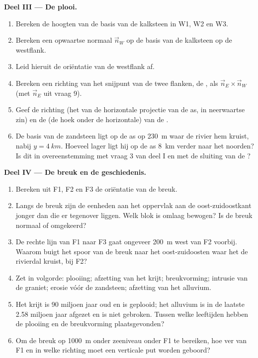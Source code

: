 \begin{problem}
\medskip
\noindent\textbf{Deel III --- De plooi.}
\begin{enumerate}[resume]
  \item Bereken de hoogten van de basis van de kalksteen in W1, W2 en W3.
  \item Bereken een opwaartse normaal $\vec n_W$ op de basis van de kalksteen op de westflank.
  \item Leid hieruit de oriëntatie van de westflank af.
  \item Bereken een richting van het snijpunt van de twee flanken, de , als $\vec n_E \times \vec n_W$
        (met $\vec n_E$ uit vraag 9).
  \item Geef de richting (het  van de horizontale projectie van de as, in neerwaartse zin) en de
         (de hoek onder de horizontale) van de .
  \item De basis van de zandsteen ligt op de as op \qty{230}{m} waar de rivier hem kruist, nabij
        $y = \qty{4}{km}$. Hoeveel lager ligt hij op de as \qty{8}{km} verder naar het noorden? Is dit in
        overeenstemming met vraag 3 van deel I en met de sluiting van de ?
\end{enumerate}

\medskip
\noindent\textbf{Deel IV --- De breuk en de geschiedenis.}
\begin{enumerate}[resume]
  \item Bereken uit F1, F2 en F3 de oriëntatie van de breuk.
  \item Langs de breuk zijn de eenheden aan het oppervlak aan de oost-zuidoostkant jonger dan die er
        tegenover liggen. Welk blok is omlaag bewogen? Is de breuk normaal of omgekeerd?
  \item De rechte lijn van F1 naar F3 gaat ongeveer \qty{200}{m} west van F2 voorbij. Waarom buigt het
        spoor van de breuk naar het oost-zuidoosten waar het de rivierdal kruist, bij F2?
  \item Zet in volgorde: plooiing; afzetting van het krijt; breukvorming; intrusie van de graniet;
        erosie vóór de zandsteen; afzetting van het alluvium.
  \item Het krijt is 90 miljoen jaar oud en is geplooid; het alluvium is in de laatste 2.58 miljoen jaar
        afgezet en is niet gebroken. Tussen welke leeftijden hebben de plooiing en de breukvorming
        plaatsgevonden?
  \item Om de breuk op \qty{1000}{m} onder zeeniveau onder F1 te bereiken, hoe ver van F1 en in welke
        richting moet een verticale put worden geboord?
\end{enumerate}
\end{problem}
